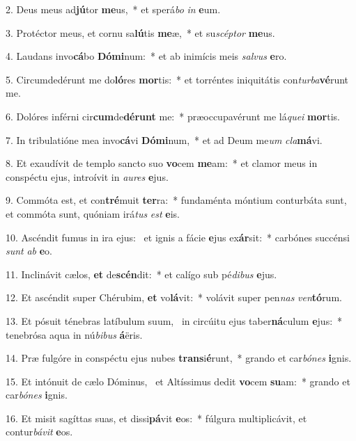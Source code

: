 2. Deus meus ad\textbf{jú}tor \textbf{me}us,~*  et sperá\textit{bo} \textit{in} \textbf{e}um.\

3. Protéctor meus, et cornu sa\textbf{lú}tis \textbf{me}æ,~*  et su\textit{scép}\textit{tor} \textbf{me}us.\

4. Laudans invo\textbf{cá}bo \textbf{Dó}\textbf{mi}num:~*  et ab inimícis meis \textit{sal}\textit{vus} \textbf{e}ro.\

5. Circumdedérunt me do\textbf{ló}res \textbf{mor}tis:~*  et torréntes iniquitátis con\textit{tur}\textit{ba}\textbf{vé}runt me.\

6. Dolóres inférni cir\textbf{cum}de\textbf{dé}\textbf{runt} me:~*  præoccupavérunt me lá\textit{que}\textit{i} \textbf{mor}tis.\

7. In tribulatióne mea invo\textbf{cá}vi \textbf{Dó}\textbf{mi}num,~*  et ad Deum me\textit{um} \textit{cla}\textbf{má}vi.\

8. Et exaudívit de templo sancto suo \textbf{vo}cem \textbf{me}am:~*  et clamor meus in conspéctu ejus, introívit in \textit{au}\textit{res} \textbf{e}jus.\

9. Commóta est, et con\textbf{tré}muit \textbf{ter}ra:~*  fundaménta móntium conturbáta sunt, et commóta sunt, quóniam irá\textit{tus} \textit{est} \textbf{e}is.\

10. Ascéndit fumus in ira ejus: \dag\  et ignis a fácie \textbf{e}jus ex\textbf{ár}sit:~*  carbónes succénsi \textit{sunt} \textit{ab} \textbf{e}o.\

11. Inclinávit cælos, \textbf{et} de\textbf{scén}dit:~*  et calígo sub pé\textit{di}\textit{bus} \textbf{e}jus.\

12. Et ascéndit super Chérubim, \textbf{et} vo\textbf{lá}vit:~*  volávit super pen\textit{nas} \textit{ven}\textbf{tó}rum.\

13. Et pósuit ténebras latíbulum suum, \dag\  in circúitu ejus taber\textbf{ná}culum \textbf{e}jus:~*  tenebrósa aqua in nú\textit{bi}\textit{bus} \textbf{á}ëris.\

14. Præ fulgóre in conspéctu ejus nubes \textbf{trans}i\textbf{é}runt,~*  grando et car\textit{bó}\textit{nes} \textbf{i}gnis.\

15. Et intónuit de cælo Dóminus, \dag\  et Altíssimus dedit \textbf{vo}cem \textbf{su}am:~*  grando et car\textit{bó}\textit{nes} \textbf{i}gnis.\

16. Et misit sagíttas suas, et dissi\textbf{pá}vit \textbf{e}os:~*  fúlgura multiplicávit, et contur\textit{bá}\textit{vit} \textbf{e}os.\

